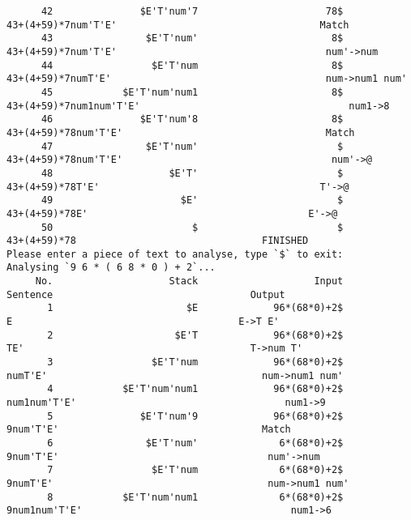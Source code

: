 \documentclass[UTF8]{ctexart}
\begin{document}
\begin{lstlisting}
      42               $E'T'num'7                      78$                    43+(4+59)*7num'T'E'                                   Match
      43                $E'T'num'                       8$                   43+(4+59)*7num'T'E'                                    num'->num
      44                 $E'T'num                       8$                   43+(4+59)*7numT'E'                                     num->num1 num'
      45            $E'T'num'num1                       8$                   43+(4+59)*7num1num'T'E'                                    num1->8
      46               $E'T'num'8                       8$                   43+(4+59)*78num'T'E'                                   Match
      47                $E'T'num'                        $                  43+(4+59)*78num'T'E'                                    num'->@
      48                    $E'T'                        $                  43+(4+59)*78T'E'                                      T'->@
      49                      $E'                        $                  43+(4+59)*78E'                                      E'->@
      50                        $                        $                  43+(4+59)*78                                FINISHED
Please enter a piece of text to analyse, type `$` to exit:
Analysing `9 6 * ( 6 8 * 0 ) + 2`...
     No.                    Stack                    Input                      Sentence                                  Output
       1                       $E             96*(68*0)+2$                              E                                       E->T E'
       2                     $E'T             96*(68*0)+2$                              TE'                                       T->num T'
       3                 $E'T'num             96*(68*0)+2$                              numT'E'                                     num->num1 num'
       4            $E'T'num'num1             96*(68*0)+2$                              num1num'T'E'                                    num1->9
       5               $E'T'num'9             96*(68*0)+2$                              9num'T'E'                                   Match
       6                $E'T'num'              6*(68*0)+2$                             9num'T'E'                                    num'->num
       7                 $E'T'num              6*(68*0)+2$                             9numT'E'                                     num->num1 num'
       8            $E'T'num'num1              6*(68*0)+2$                             9num1num'T'E'                                    num1->6

\end{lstlisting}
\end{document}
